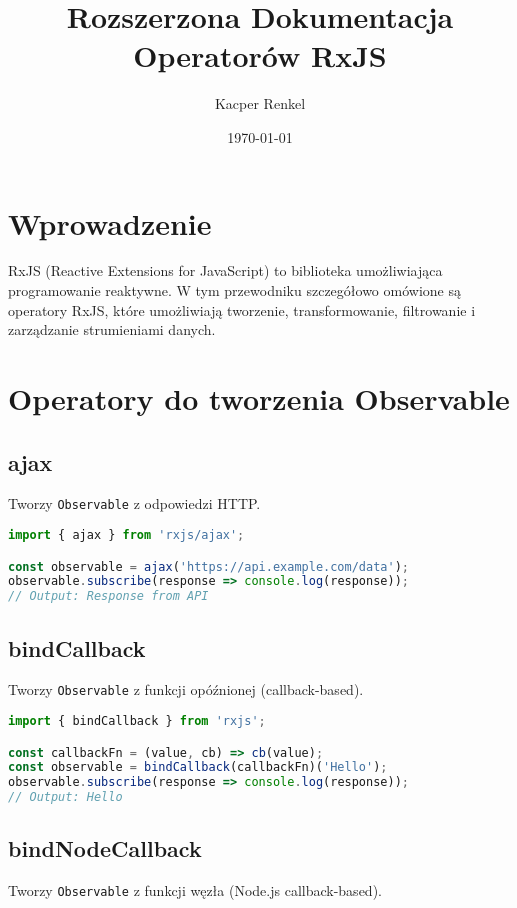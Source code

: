 \documentclass[a4paper,12pt]{article}
\title{Rozszerzona Dokumentacja Operatorów RxJS}
\author{Kacper Renkel}
\date{\today}
\begin{document}
\maketitle

\tableofcontents
\newpage

\section{Wprowadzenie}
RxJS (Reactive Extensions for JavaScript) to biblioteka umożliwiająca programowanie reaktywne. W tym przewodniku szczegółowo omówione są operatory RxJS, które umożliwiają tworzenie, transformowanie, filtrowanie i zarządzanie strumieniami danych.

\section{Operatory do tworzenia Observable}
\subsection{ajax}
Tworzy \texttt{Observable} z odpowiedzi HTTP.

\begin{lstlisting}[language=JavaScript, caption=Przykład użycia \texttt{ajax}]
import { ajax } from 'rxjs/ajax';

const observable = ajax('https://api.example.com/data');
observable.subscribe(response => console.log(response));
// Output: Response from API
\end{lstlisting}

\subsection{bindCallback}
Tworzy \texttt{Observable} z funkcji opóźnionej (callback-based).

\begin{lstlisting}[language=JavaScript, caption=Przykład użycia \texttt{bindCallback}]
import { bindCallback } from 'rxjs';

const callbackFn = (value, cb) => cb(value);
const observable = bindCallback(callbackFn)('Hello');
observable.subscribe(response => console.log(response));
// Output: Hello
\end{lstlisting}

\subsection{bindNodeCallback}
Tworzy \texttt{Observable} z funkcji węzła (Node.js callback-based).
\end{document}
